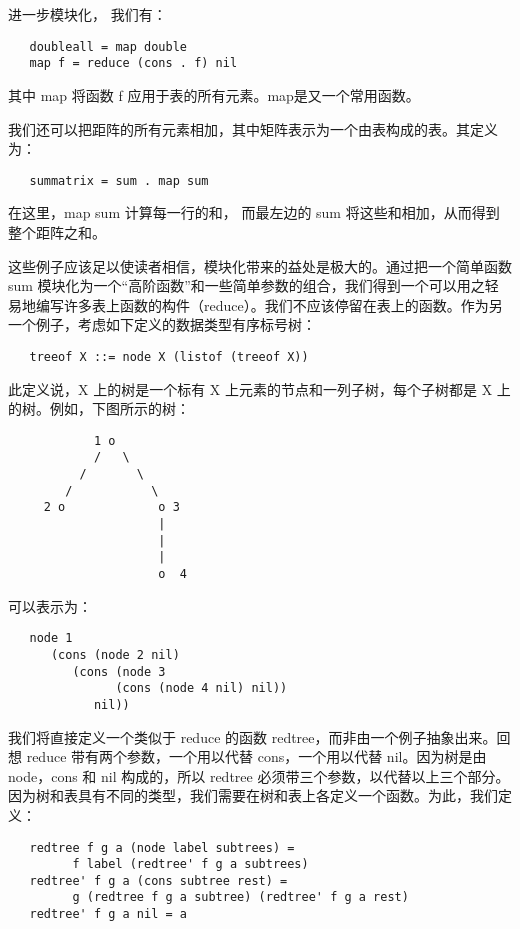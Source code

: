 \documentclass[12pt]{article}
\begin{document}
进一步模块化， 我们有：

\begin{verbatim}
   doubleall = map double
   map f = reduce (cons . f) nil
\end{verbatim}

其中 map 将函数 f 应用于表的所有元素。map是又一个常用函数。

我们还可以把距阵的所有元素相加，其中矩阵表示为一个由表构成的表。其定义为：

\begin{verbatim}
   summatrix = sum . map sum
\end{verbatim}

在这里，map sum 计算每一行的和， 而最左边的 sum 将这些和相加，从而得到整个距阵之和。

这些例子应该足以使读者相信，模块化带来的益处是极大的。通过把一个简单函数 sum 模块化为一个``高阶函数''和一些简单参数的组合，我们得到一个可以用之轻易地编写许多表上函数的构件（reduce）。我们不应该停留在表上的函数。作为另一个例子，考虑如下定义的数据类型有序标号树：

\begin{verbatim}
   treeof X ::= node X (listof (treeof X))
\end{verbatim}

此定义说，X 上的树是一个标有 X 上元素的节点和一列子树，每个子树都是 X 上的树。例如，下图所示的树：

\begin{verbatim}
            1 o
            /   \
          /       \
        /           \
     2 o             o 3
                     |
                     |
                     |
                     o  4
\end{verbatim}

可以表示为：

\begin{verbatim}
   node 1 
      (cons (node 2 nil)
         (cons (node 3
               (cons (node 4 nil) nil))
            nil))
\end{verbatim}

我们将直接定义一个类似于 reduce 的函数 redtree，而非由一个例子抽象出来。回想 reduce 带有两个参数，一个用以代替 cons，一个用以代替 nil。因为树是由 node，cons 和 nil 构成的，所以 redtree 必须带三个参数，以代替以上三个部分。因为树和表具有不同的类型，我们需要在树和表上各定义一个函数。为此，我们定义：

\begin{verbatim}
   redtree f g a (node label subtrees) =
         f label (redtree' f g a subtrees)
   redtree' f g a (cons subtree rest) = 
         g (redtree f g a subtree) (redtree' f g a rest)
   redtree' f g a nil = a
\end{verbatim}
\end{document}
